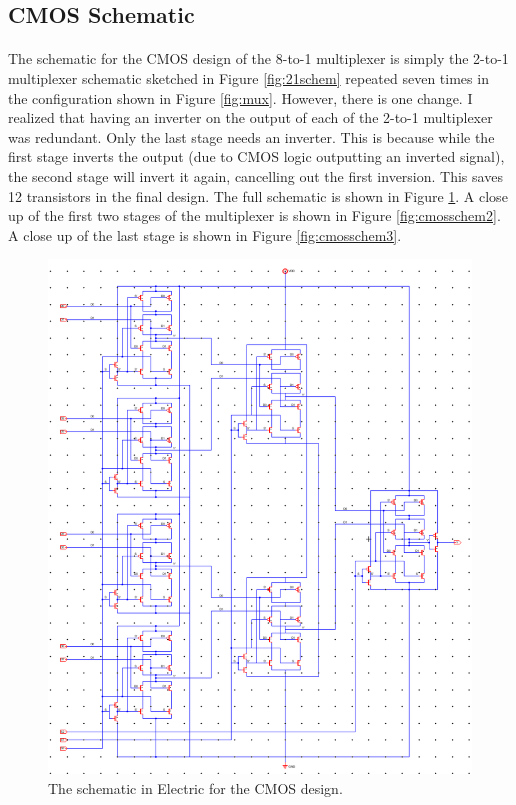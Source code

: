 \documentclass{article}
\begin{document}
  \subsection{CMOS Schematic}
    \paragraph{}
    The schematic for the CMOS design of the 8-to-1 multiplexer is simply the 2-to-1 multiplexer schematic sketched in Figure \ref{fig:21schem} repeated seven times in the configuration shown in Figure \ref{fig:mux}. However, there is one change. I realized that having an inverter on the output of each of the 2-to-1 multiplexer was redundant. Only the last stage needs an inverter. This is because while the first stage inverts the output (due to CMOS logic outputting an inverted signal), the second stage will invert it again, cancelling out the first inversion. This saves 12 transistors in the final design. The full schematic is shown in Figure \ref{fig:cmosschem1}. A close up of the first two stages of the multiplexer is shown in Figure \ref{fig:cmosschem2}. A close up of the last stage is shown in Figure \ref{fig:cmosschem3}.


    \begin{figure}[H]
      \centering
      \includegraphics[width=0.9\linewidth, frame]{screenshots/cmos/schem/schem1.png}
      \caption{The schematic in Electric for the CMOS design.}
      \label{fig:cmosschem1}
    \end{figure}
\end{document}
